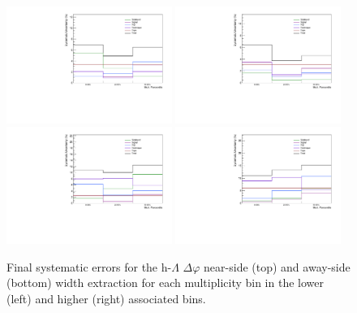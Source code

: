 \begin{figure}[ht]
    \centering
        \includegraphics[width=0.48\textwidth]{figures/analysis/systematics_ns_width_postbarlow_lowpt.pdf}
        \includegraphics[width=0.48\textwidth]{figures/analysis/systematics_ns_width_postbarlow_highpt.pdf}
        \includegraphics[width=0.48\textwidth]{figures/analysis/systematics_as_width_postbarlow_lowpt.pdf}
        \includegraphics[width=0.48\textwidth]{figures/analysis/systematics_as_width_postbarlow_highpt.pdf}
    \caption{Final systematic errors for the h-$\Lambda$ $\Delta\varphi$ near-side (top) and away-side (bottom) width extraction for each multiplicity bin in the lower (left) and higher (right) associated \pt bins.}
    \label{fig:h_lambda_width_systematics_plots}
\end{figure}

